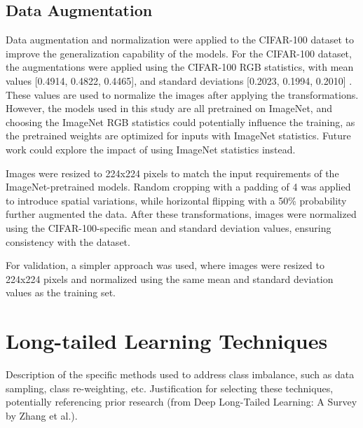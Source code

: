 


\subsection{Data Augmentation}
Data augmentation and normalization were applied to the CIFAR-100 dataset to improve the generalization capability of the models. For the CIFAR-100 dataset, the augmentations were applied using the CIFAR-100 RGB statistics, with mean values [0.4914, 0.4822, 0.4465], and standard deviations [0.2023, 0.1994, 0.2010] \cite{kaidic_ldam_drw}. These values are used to normalize the images after applying the transformations. However, the models used in this study are all pretrained on ImageNet, and choosing the ImageNet RGB statistics could potentially influence the training, as the pretrained weights are optimized for inputs with ImageNet statistics. Future work could explore the impact of using ImageNet statistics instead.

Images were resized to 224x224 pixels to match the input requirements of the ImageNet-pretrained models. Random cropping with a padding of 4 was applied to introduce spatial variations, while horizontal flipping with a 50\% probability further augmented the data. After these transformations, images were normalized using the CIFAR-100-specific mean and standard deviation values, ensuring consistency with the dataset.

For validation, a simpler approach was used, where images were resized to 224x224 pixels and normalized using the same mean and standard deviation values as the training set.

\section{Long-tailed Learning Techniques}
Description of the specific methods used to address class imbalance, such as data sampling, class re-weighting, etc. 
Justification for selecting these techniques, potentially referencing prior research (from Deep Long-Tailed Learning: A Survey by Zhang et al.).


